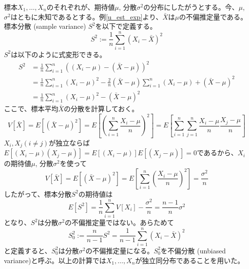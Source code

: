 \documentclass[uplatex,dvipdfmx]{jlreq}
\newcommand\term[1]{\textsf{#1}}
\begin{document}
\begin{example}[期待値が未知の場合の分散の不偏推定量]\label{u_est_var}
    標本$X_1, \dotsc, X_n$のそれぞれが、期待値$\mu$, 分散$\sigma^2$の分布にしたがうとする。今、$\mu$, $\sigma^2$はともに未知であるとする。例\ref{u_est_exp}より、$\bar{X}$は$\mu$の不偏推定量である。\term{標本分散 (sample variance)} $S^2$を以下で定義する。
    \begin{equation}
        S^2 := \frac{1}{n}\sum_{i=1}^n (X_i - \bar{X})^2
    \end{equation}
    $S^2$は以下のように式変形できる。
    \begin{equation}
        \begin{split}
            S^2
            &= \frac{1}{n}\sum_{i=1}^n ((X_i - \mu) - (\bar{X} - \mu))^2\\
            &= \frac{1}{n}\sum_{i=1}^n (X_i - \mu)^2
            - \frac{2}{n}(\bar{X} - \mu)\sum_{i=1}^n (X_i - \mu)
            +(\bar{X} - \mu)^2\\
            &= \frac{1}{n}\sum_{i=1}^n (X_i - \mu)^2
            -(\bar{X} - \mu)^2
        \end{split}
    \end{equation}
    ここで、標本平均$\bar{X}$の分散を計算しておく。
    \begin{equation}
        V[\bar{X}] = E[(\bar{X} - \mu)^2]
        = E\left[\left(\sum_{i=1}^n\frac{X_i - \mu}{n}\right)^2\right]
        = E\left[\sum_{i=1}^n\sum_{j=1}^n\frac{X_i - \mu}{n}\frac{X_j - \mu}{n}\right]
    \end{equation}
    $X_i, X_j (i \neq j)$が独立ならば$E[(X_i-\mu)(X_j-\mu)] = E[(X_i-\mu)]E[(X_j-\mu)] = 0$であるから、$X_i$の期待値$\mu$, 分散$\sigma^2$を使って
    \begin{equation}
        V[\bar{X}] = E[(\bar{X} - \mu)^2]
        = E\left[\sum_{i=1}^n\left(\frac{X_i - \mu}{n}\right)^2\right]
        = \frac{\sigma^2}{n}
    \end{equation}
    したがって、標本分散$S^2$の期待値は
    \begin{equation}
        E[S^2]
        = \frac{1}{n}\sum_{i=1}^n V[X_i] - \frac{\sigma^2}{n}
        = \frac{n-1}{n}\sigma^2
    \end{equation}
    となり、$S^2$は分散$\sigma^2$の不偏推定量ではない。あらためて
    \begin{equation}
        S_0^2 := \frac{n}{n-1}S^2
        = \frac{1}{n-1}\sum_{i=1}^n (X_i - \bar{X})^2
    \end{equation}
    と定義すると、$S_0^2$は分散$\sigma^2$の不偏推定量になる。$S_0^2$を\term{不偏分散 (unbiased variance)}と呼ぶ。以上の計算では$X_1, \dotsc, X_n$が独立同分布であることを用いた。
\end{example}
\end{document}
